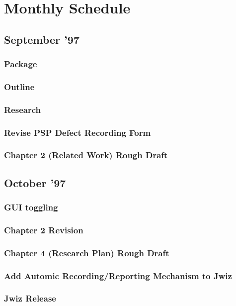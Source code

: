 \section{Monthly Schedule}

\subsection{September '97}
\subsubsection{Package}
\subsubsection{Outline}
\subsubsection{Research}
\subsubsection{Revise PSP Defect Recording Form}
\subsubsection{Chapter 2 (Related Work) Rough Draft}

\subsection{October '97}
\subsubsection{GUI toggling}
\subsubsection{Chapter 2 Revision}
\subsubsection{Chapter 4 (Research Plan) Rough Draft}
\subsubsection{Add Automic Recording/Reporting Mechanism to Jwiz}
\subsubsection{Jwiz Release}

